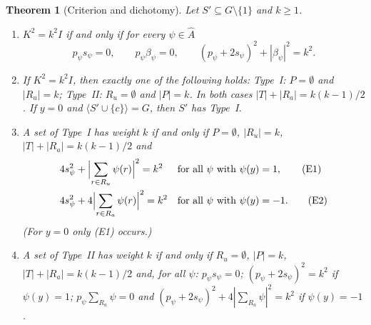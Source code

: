 \documentclass[preprint,11pt]{elsarticle}
\newtheorem{theorem}{Theorem}[section]
\theoremstyle{definition}
\theoremstyle{remark}
\begin{document}
\begin{theorem}[Criterion and dichotomy]\label{gd:fourier}
Let $S'\subseteq G\setminus\{1\}$ and $k\ge1$.
\begin{enumerate}
\item[(a)] $K^2=k^2I$ if and only if for every $\psi\in\widehat A$
\begin{equation}\label{gd:F}
p_\psi s_\psi=0,\qquad p_\psi\beta_\psi=0,\qquad (p_\psi+2s_\psi)^2+|\beta_\psi|^2=k^2 .
\end{equation}
\item[(b)] If $K^2=k^2I$, then exactly one of the following holds: \emph{Type~I}: $P=\emptyset$ and $|R_u|=k$; \emph{Type~II}: $R_u=\emptyset$ and $|P|=k$. In both cases $|T|+|R_a|=k(k-1)/2$. If $y=0$ and $\langle S'\cup\{c\}\rangle=G$, then $S'$ has Type~I.
\item[(c)] A set of Type~I has weight $k$ if and only if $P=\emptyset$, $|R_u|=k$, $|T|+|R_a|=k(k-1)/2$ and
\begin{align}
&4s_\psi^2+\Bigl|\sum_{r\in R_u}\psi(r)\Bigr|^2=k^2 &&\text{for all }\psi\text{ with }\psi(y)=1,\tag{E1}\\
&4s_\psi^2+4\Bigl|\sum_{r\in R_a}\psi(r)\Bigr|^2=k^2 &&\text{for all }\psi\text{ with }\psi(y)=-1.\tag{E2}
\end{align}
(For $y=0$ only (E1) occurs.)
\item[(d)] A set of Type~II has weight $k$ if and only if $R_u=\emptyset$, $|P|=k$, $|T|+|R_a|=k(k-1)/2$ and, for all $\psi$: $p_\psi s_\psi=0$; $(p_\psi+2s_\psi)^2=k^2$ if $\psi(y)=1$; $p_\psi\sum_{R_a}\psi=0$ and $(p_\psi+2s_\psi)^2+4|\sum_{R_a}\psi|^2=k^2$ if $\psi(y)=-1$.
\end{enumerate}
\end{theorem}
\end{document}

